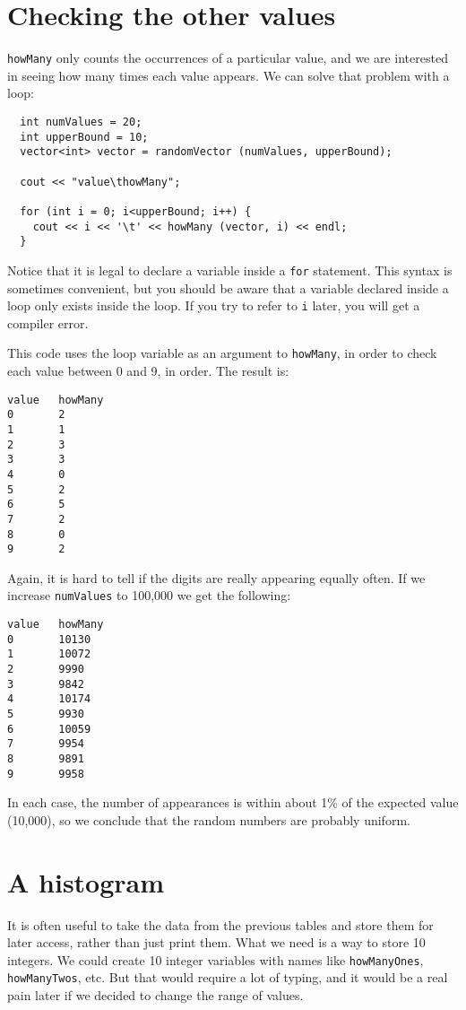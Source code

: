 \section{Checking the other values}

{\tt howMany} only counts the occurrences of a particular value, and
we are interested in seeing how many times each value appears.
We can solve that problem with a loop:

\begin{lstlisting}
  int numValues = 20;
  int upperBound = 10;
  vector<int> vector = randomVector (numValues, upperBound);

  cout << "value\thowMany";

  for (int i = 0; i<upperBound; i++) {
    cout << i << '\t' << howMany (vector, i) << endl;
  }
\end{lstlisting}
%
Notice that it is legal to declare a variable inside a {\tt for}
statement.  This syntax is sometimes convenient, but you should
be aware that a variable declared inside a loop only exists
inside the loop.  If you try to refer to {\tt i} later, you
will get a compiler error.

This code uses the loop variable as an argument to
{\tt howMany}, in order to check each value between 0 and 9,
in order.  The result is:

\begin{verbatim}
value   howMany
0       2
1       1
2       3
3       3
4       0
5       2
6       5
7       2
8       0
9       2
\end{verbatim}
%
Again, it is hard to tell if the digits are really appearing
equally often.  If we increase {\tt numValues} to 100,000 we
get the following:

\begin{verbatim}
value   howMany
0       10130
1       10072
2       9990
3       9842
4       10174
5       9930
6       10059
7       9954
8       9891
9       9958
\end{verbatim}
%
In each case, the number of appearances is within about 1\% of
the expected value (10,000), so we conclude that the random
numbers are probably uniform.

\section {A histogram}

It is often useful to take the data from the previous tables
and store them for later access, rather than just print them.
What we need is a way to store 10 integers.  We could create
10 integer variables with names like {\tt howManyOnes},
{\tt howManyTwos}, etc.  But that would require a lot of
typing, and it would be a real pain later if we decided to
change the range of values.

